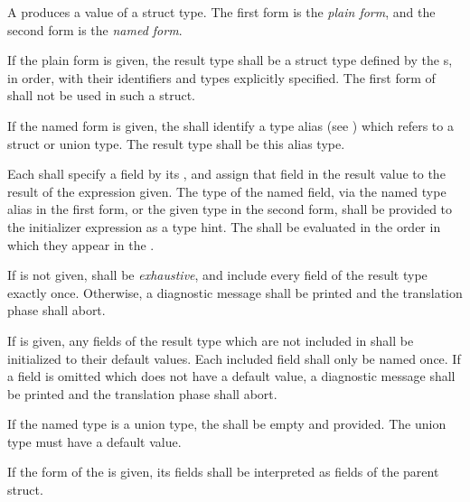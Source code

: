 \specsubsubitem
A  produces a value of a struct type. The first
form is the \textit{plain form}, and the second form is the \textit{named form}.

\specsubsubitem
If the plain form is given, the result type shall be a struct type defined by
the s, in order, with their identifiers and types
explicitly specified. The first form of  shall not be
used in such a struct.

\specsubsubitem
If the named form is given, the  shall identify a type
alias (see ) which refers to a struct or union type.
The result type shall be this alias type.

\specsubsubitem
Each  shall specify a field by its ,
and assign that field in the result value to the result of the expression
given. The type of the named field, via the named type alias in the first form,
or the given type in the second form, shall be provided to the initializer
expression as a type hint. The  shall be evaluated in
the order in which they appear in the .

\specsubsubitem
If  is not given,  shall be
\textit{exhaustive}, and include every field of the result type exactly once.
Otherwise, a diagnostic message shall be printed and the translation phase
shall abort.

\specsubsubitem
If  is given, any fields of the result type which are not
included in  shall be initialized to their default
values. Each included field shall only be named once. If a field is omitted
which does not have a default value, a diagnostic message shall be printed and
the translation phase shall abort.

\specsubsubitem
If the named type is a union type, the  shall be
empty and  provided. The union type must have a default value.

\specsubsubitem
If the  form of the  is
given, its fields shall be interpreted as fields of the parent struct.


